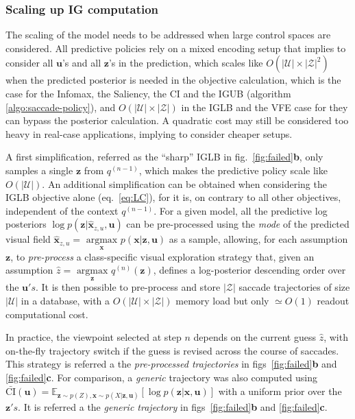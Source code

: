 \documentclass[12pt,twoside,openright]{article}
\begin{document}
\subsubsection{Scaling up IG computation}
The scaling of the model needs to be addressed when large control spaces are considered. All predictive policies rely on a mixed encoding setup that implies to consider all $\boldsymbol{u}$'s and all $\boldsymbol{z}$'s in the prediction, which scales like $O(|\mathcal{U}|\times|\mathcal{Z}|^2)$ when the predicted posterior is needed in the objective calculation, which is the case for the Infomax, the Saliency, the CI and the IGUB (algorithm \ref{algo:saccade-policy}), and $O(|\mathcal{U}|\times|\mathcal{Z}|)$ in the {\color{Purple}IGLB} and the VFE case for they can bypass the posterior calculation. A quadratic cost may still be considered too heavy in real-case applications, implying to consider cheaper setups. 

A first simplification, referred as the ``sharp'' IGLB in  fig.~\ref{fig:failed}\textbf{b}, only samples a single $\boldsymbol{z}$ from $q^{(n-1)}$, which makes the predictive policy scale like $O(|\mathcal{U}|)$. An additional simplification can be obtained when considering the IGLB objective alone (eq.~\ref{eq:LC}), for it is, on contrary to all other objectives, independent of the context $q^{(n-1)}$. For a given model, all the predictive log posteriors $\log p(\boldsymbol{z}|\hat{\boldsymbol{x}}_{z,u}, \boldsymbol{u})$ can be pre-processed using the \emph{mode} of the predicted visual field $\hat{\boldsymbol{x}}_{z,u} = \underset{\boldsymbol{x}}{\text{ argmax }} p(\boldsymbol{x}|\boldsymbol{z}, \boldsymbol{u})$ as a sample, allowing, for each assumption $\boldsymbol{z}$, to \emph{pre-process} a class-specific visual exploration strategy that, given an assumption $\hat{z} = \underset{\boldsymbol{\boldsymbol{z}}}{\text{ argmax }} q^{(n)}(\boldsymbol{z})$, defines a log-posterior descending order over the $\boldsymbol{u}'s$. It is then possible to pre-process and store $|\mathcal{Z}|$ saccade trajectories of size $|\mathcal{U}|$ in a database, with a $O(|\mathcal{U}|\times|\mathcal{Z}|)$ memory load but only $\simeq O(1)$ readout computational cost. 

In practice, the viewpoint selected at step $n$ depends on the current guess $\hat{z}$, with on-the-fly trajectory switch if the guess is revised across the course of saccades. This strategy is referred a the \emph{pre-processed trajectories} in figs~\ref{fig:failed}\textbf{b} and \ref{fig:failed}\textbf{c}.
For comparison, a \emph{generic} trajectory was also computed using $\bar{\text{CI}}(\boldsymbol{u})
= \mathbb{E}_{\boldsymbol{z} \sim p(Z), \boldsymbol{x} \sim p(X|\boldsymbol{z}, \boldsymbol{u})}\left[ \log p(\boldsymbol{z}|\boldsymbol{x}, \boldsymbol{u})\right]$ with a uniform prior over the $\boldsymbol{z}'s$.  
It is referred a the \emph{generic trajectory} in figs~\ref{fig:failed}\textbf{b} and \ref{fig:failed}\textbf{c}.
\end{document}
